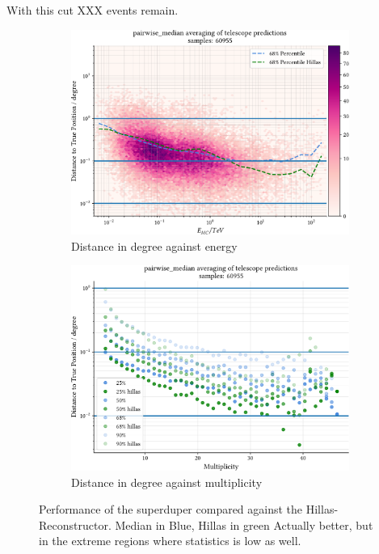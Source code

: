 With this cut XXX events remain.
\begin{figure}
    \centering
    \begin{subfigure}{0.45\textwidth}
        \includegraphics[width=0.9\linewidth]{../analysis/plots/gamma_cut/pairwise_median_100_vs_energy.pdf} 
        \caption{Distance in degree against energy}
    \end{subfigure}
    \begin{subfigure}{0.45\textwidth}
        \includegraphics[width=0.9\linewidth]{../analysis/plots/gamma_cut/pairwise_median_100_vs_multi_comp.pdf}
        \caption{Distance in degree against multiplicity}
    \end{subfigure}
    \caption{Performance of the superduper compared 
    against the Hillas-Reconstructor. Median in Blue, Hillas in green
    Actually better, but in the extreme regions where statistics is low as well.}
    \label{fig:stereo_double}
\end{figure}


